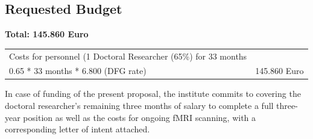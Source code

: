 \documentclass[11pt,a4paper]{article}
\begin{document}
\newpage

\subsection*{Requested Budget}

\noindent\textbf{Total: 145.860 Euro}

\begin{longtable}{p{12cm} p{\dimexpr\textwidth-12cm-2\tabcolsep}}
\toprule
\endfirsthead
\endhead
Costs for personnel (1 Doctoral Researcher (65\%) for 33 months \\ 0.65 * 33 months * 6.800 (DFG rate) & 145.860 Euro \\
\bottomrule
\end{longtable}

In case of funding of the present proposal, the institute commits to covering the doctoral researcher's remaining three 
months of salary to complete a full three-year position as well as the costs for ongoing fMRI scanning, 
with a corresponding letter of intent attached.\\

\newpage

\printbibliography
\end{document}
